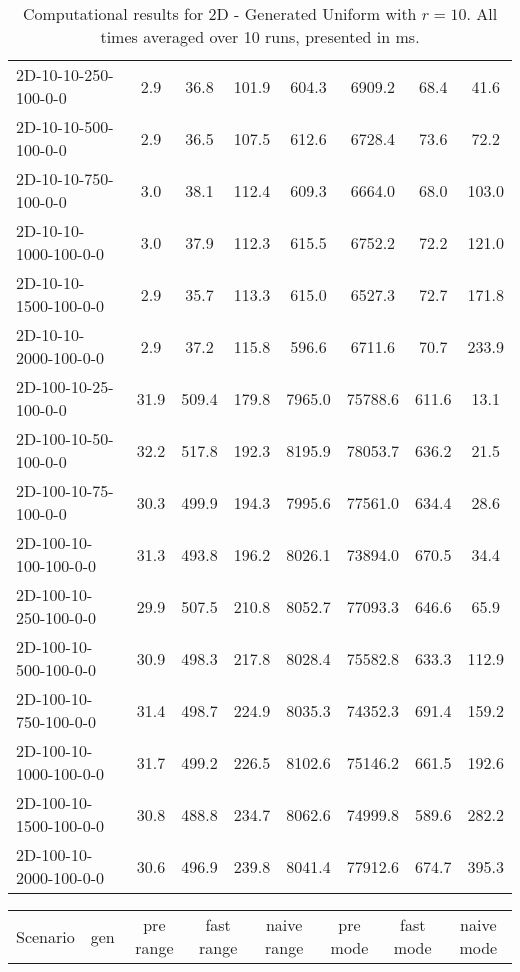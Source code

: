 \documentclass{article}
\begin{document}
\begin{center}
\begin{table}[h]
\begin{tabular}{|l||c|c|c|c|c|c|c|}
        2D-10-10-250-100-0-0 & 2.9 & 36.8 & 101.9 & 604.3 & 6909.2 & 68.4 & 41.6 \\
        2D-10-10-500-100-0-0 & 2.9 & 36.5 & 107.5 & 612.6 & 6728.4 & 73.6 & 72.2 \\
        2D-10-10-750-100-0-0 & 3.0 & 38.1 & 112.4 & 609.3 & 6664.0 & 68.0 & 103.0 \\
        2D-10-10-1000-100-0-0 & 3.0 & 37.9 & 112.3 & 615.5 & 6752.2 & 72.2 & 121.0 \\
        2D-10-10-1500-100-0-0 & 2.9 & 35.7 & 113.3 & 615.0 & 6527.3 & 72.7 & 171.8 \\
        2D-10-10-2000-100-0-0 & 2.9 & 37.2 & 115.8 & 596.6 & 6711.6 & 70.7 & 233.9 \\
        \hline
        2D-100-10-25-100-0-0 & 31.9 & 509.4 & 179.8 & 7965.0 & 75788.6 & 611.6 & 13.1 \\
        2D-100-10-50-100-0-0 & 32.2 & 517.8 & 192.3 & 8195.9 & 78053.7 & 636.2 & 21.5 \\
        2D-100-10-75-100-0-0 & 30.3 & 499.9 & 194.3 & 7995.6 & 77561.0 & 634.4 & 28.6 \\
        2D-100-10-100-100-0-0 & 31.3 & 493.8 & 196.2 & 8026.1 & 73894.0 & 670.5 & 34.4 \\
        2D-100-10-250-100-0-0 & 29.9 & 507.5 & 210.8 & 8052.7 & 77093.3 & 646.6 & 65.9 \\
        2D-100-10-500-100-0-0 & 30.9 & 498.3 & 217.8 & 8028.4 & 75582.8 & 633.3 & 112.9 \\
        2D-100-10-750-100-0-0 & 31.4 & 498.7 & 224.9 & 8035.3 & 74352.3 & 691.4 & 159.2 \\
        2D-100-10-1000-100-0-0 & 31.7 & 499.2 & 226.5 & 8102.6 & 75146.2 & 661.5 & 192.6 \\
        2D-100-10-1500-100-0-0 & 30.8 & 488.8 & 234.7 & 8062.6 & 74999.8 & 589.6 & 282.2 \\
        2D-100-10-2000-100-0-0 & 30.6 & 496.9 & 239.8 & 8041.4 & 77912.6 & 674.7 & 395.3 \\
        \hline
        \end{tabular}
        \caption{Computational results for 2D - Generated Uniform with $r=10$. All times averaged over 10 runs, presented in ms.}
    \end{table}
    \begin{table}[h]
        \hskip0.8cm
        \begin{tabular}{|l||c|c|c|c|c|c|c|}
        \hline
        \multicolumn{1}{|c|}{Scenario} & gen & pre range & fast range & naive range & pre mode & fast mode & naive mode  \\

\end{tabular}
\end{table}
\end{center}
\end{document}
